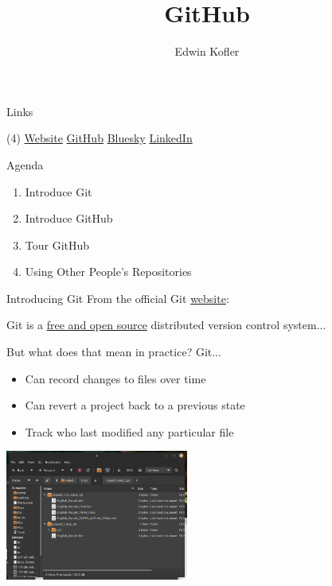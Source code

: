 \documentclass{beamer}
\title{GitHub}
\author{Edwin Kofler}
\begin{document}
\begin{frame}
	\titlepage
	\small{Links}
	\begin{tasks}[](4)
		\task \href{https://edwinkofler.com}{Website}
		\task \href{https://github.com/hyperupcall}{GitHub}
		\task \href{https://bsky.app/profile/hyperupcall.bsky.social}{Bluesky}
		\task \href{https://www.linkedin.com/in/hyperupcall}{LinkedIn}
	\end{tasks}
\end{frame}

\begin{frame}{Agenda}
	\begin{enumerate}
		\item Introduce Git
		\item Introduce GitHub
		\item Tour GitHub
		\item Using Other People's Repositories
	\end{enumerate}
\end{frame}

\begin{frame}{Introducing Git}
	From the official Git \href{https://git-scm.com}{website}: \newline

	\begin{displayquote}
		Git is a \href{https://git-scm.com/about/free-and-open-source}{free and open source} distributed version control system...
	\end{displayquote}

	{
	\small

	But what does that mean in practice? Git...

	\begin{itemize}
		\item Can record changes to files over time
		\item Can revert a project back to a previous state
		\item Track who last modified any particular file
	\end{itemize}
	}

	\href{https://raw.githubusercontent.com/ecc-cs-club/slides/main/1-Git-And-GitHub/assets/using-git.png}{
		\includegraphics[width=6cm]{using-git.png}
	}


\end{frame}
\end{document}
